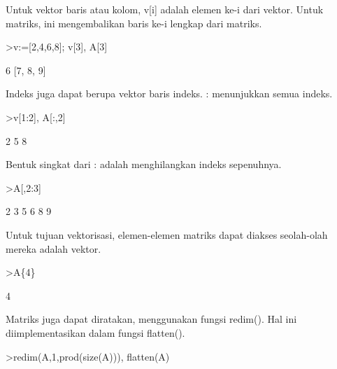 \documentclass[a4paper,10pt]{article}
\begin{document}
\begin{eulernotebook}
\begin{eulercomment}
\begin{eulercomment}
\begin{eulercomment}
\begin{eulercomment}
\begin{eulercomment}
\begin{eulercomment}
\begin{eulercomment}
Untuk vektor baris atau kolom, v[i] adalah elemen ke-i dari vektor.
Untuk matriks, ini mengembalikan baris ke-i lengkap dari matriks.
\end{eulercomment}
\begin{eulerprompt}
>v:=[2,4,6,8]; v[3], A[3]
\end{eulerprompt}
\begin{euleroutput}
  6
  [7,  8,  9]
\end{euleroutput}
\begin{eulercomment}
Indeks juga dapat berupa vektor baris indeks. : menunjukkan semua
indeks.
\end{eulercomment}
\begin{eulerprompt}
>v[1:2], A[:,2]
\end{eulerprompt}
\begin{euleroutput}
  [2,  4]
              2 
              5 
              8 
\end{euleroutput}
\begin{eulercomment}
Bentuk singkat dari : adalah menghilangkan indeks sepenuhnya.
\end{eulercomment}
\begin{eulerprompt}
>A[,2:3]
\end{eulerprompt}
\begin{euleroutput}
              2             3 
              5             6 
              8             9 
\end{euleroutput}
\begin{eulercomment}
Untuk tujuan vektorisasi, elemen-elemen matriks dapat diakses
seolah-olah mereka adalah vektor.
\end{eulercomment}
\begin{eulerprompt}
>A\{4\}
\end{eulerprompt}
\begin{euleroutput}
  4
\end{euleroutput}
\begin{eulercomment}
Matriks juga dapat diratakan, menggunakan fungsi redim(). Hal ini
diimplementasikan dalam fungsi flatten().
\end{eulercomment}
\begin{eulerprompt}
>redim(A,1,prod(size(A))), flatten(A)
\end{eulerprompt}
\begin{euleroutput}
  [1,  2,  3,  4,  5,  6,  7,  8,  9]
  [1,  2,  3,  4,  5,  6,  7,  8,  9]
\end{euleroutput}

\end{eulercomment}
\end{eulercomment}
\end{eulercomment}
\end{eulercomment}
\end{eulercomment}
\end{eulercomment}
\end{eulernotebook}
\end{document}
